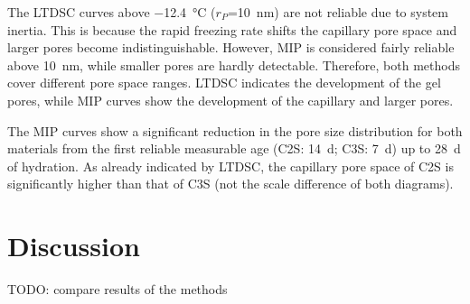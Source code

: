 The \ac{LTDSC} curves above \qty{-12.4}{\celsius} ($r_P$=\qty{10}{\nano\meter}) are not reliable due to system inertia.
This is because the rapid freezing rate shifts the capillary pore space and larger pores become indistinguishable.
However, \ac{MIP} is considered fairly reliable above \qty{10}{\nano\meter}, while smaller pores are hardly detectable.
Therefore, both methods cover different pore space ranges.
\ac{LTDSC} indicates the development of the gel pores, while \ac{MIP} curves show the development of the capillary and larger pores.

The \ac{MIP} curves show a significant reduction in the pore size distribution for both materials from the first reliable measurable age (\ac{C2S}: \qty{14}{\day}; \ac{C3S}: \qty{7}{\day}) up to \qty{28}{\day} of hydration.
As already indicated by \ac{LTDSC}, the capillary pore space of \ac{C2S} is significantly higher than that of \ac{C3S} (not the scale difference of both diagrams).

\section{Discussion}
\color{red}
TODO: compare results of the methods
\color{black}
